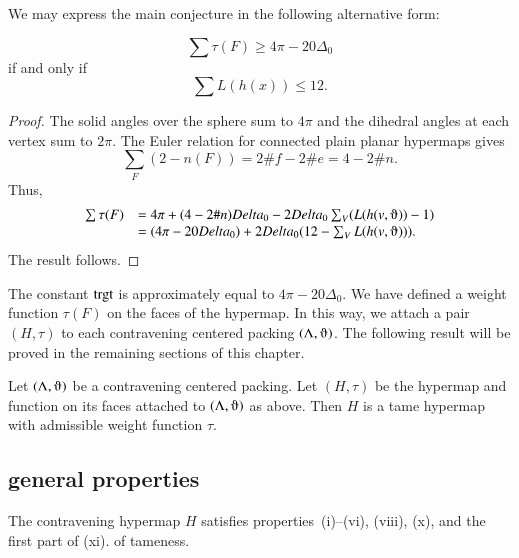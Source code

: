 We may express the main conjecture in the following alternative form:

\begin{lemma}
$$
\sum \tau (F) \ge 4\pi - 20\Delta_0
$$
if and only if
$$
\sum L(h(x)) \le 12.
$$
\end{lemma}

\begin{proof}
The solid angles over the sphere sum to $4\pi$ and the dihedral angles at each vertex sum to $2\pi$.  The Euler relation for connected plain planar hypermaps gives
$$
\sum_F (2- n(F)) = 2\#f - 2\#e = 4 - 2\#n.
$$
Thus,
\begin{equation}\label{eqn:delta0}
\begin{array}{lll}
\sum \tau (F) 
&= 4\pi + (4-2\#n) \Delta_0 - 2\Delta_0 \sum_V (L(h(v,\orgn))-1) \\
&= (4\pi - 20\Delta_0) + 2\Delta_0 (12 - \sum_V L(h(v,\orgn))).
\end{array}
\end{equation}
The result follows.
\end{proof}

The constant ${\operatorname{trgt}}$ is approximately equal to $4\pi - 20\Delta_0$.
We have defined a weight function $\tau(F)$ on the faces of the hypermap.  In this way, we attach a pair $(H,\tau)$ to each contravening centered packing $(\Lambda,\orgn)$.  The following result will be proved in the remaining sections of this chapter.


\begin{theorem} \label{theorem:contravene}
Let $(\Lambda,\orgn)$ be a contravening centered packing.  Let $(H,\tau)$ be
the hypermap and function on its faces attached to $(\Lambda,\orgn)$ as above.
Then $H$ is a tame hypermap with admissible weight function $\tau$.
\end{theorem}




\subsection{general properties}
    \label{sec:startame}



\begin{lemma} %
The contravening hypermap $H$ satisfies properties~(i)--(vi), (viii),  (x), and the first part of (xi).
of tameness.
\end{lemma}

